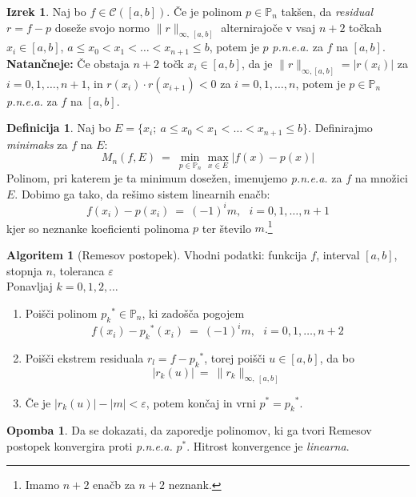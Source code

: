 \documentclass[11pt]{article}
\newcommand{\p}{\mathbb{P}}
\newcommand{\C}{\mathcal{C}}
\theoremstyle{definition}
\newtheorem{definicija}{Definicija}[section]
\theoremstyle{definition}
\newtheorem{izrek}{Izrek}
\newtheorem*{algoritem}{Algoritem}
\newtheorem*{opomba}{Opomba}
\begin{document}
\begin{izrek}

Naj bo $f \in \C([a, b])$. Če je polinom $p \in \p_n$ takšen, da \textit{residual} $r = f - p$ doseže svojo normo $\|r\|_{\infty,~[a, b]}$ alternirajoče v vsaj $n+2$ točkah $x_i \in [a, b]$, $a \leq x_0 < x_1 < \ldots < x_{n+1} \leq b$, potem je $p$ \textit{p.n.e.a.} za $f$ na $[a, b]$. \\

\textbf{Natančneje:} Če obstaja $n+2$ točk $x_i \in [a, b]$, da je $\|r\|_{\infty, [a, b]} = |r(x_i)|$ za $i = 0, 1, \ldots, n+1$, in $r(x_i) \cdot r(x_{i+1}) < 0$ za $i = 0, 1, \ldots, n$, potem je $p \in \p_n$ \textit{p.n.e.a.} za $f$ na $[a, b]$.

\end{izrek}
\vspace{0.5cm}

\begin{definicija}

Naj bo $E = \{x_i;~a \leq x_0 < x_1 < \ldots < x_{n+1} \leq b\}$. Definirajmo \textit{minimaks} za $f$ na $E$:
$$M_n(f, E) ~=~ \min_{p \in \p_n} \max_{x \in E} |f(x) - p(x)|$$
Polinom, pri katerem je ta minimum dosežen, imenujemo \textit{p.n.e.a.} za $f$ na množici $E$. Dobimo ga tako, da rešimo sistem linearnih enačb:
$$f(x_i) - p(x_i) ~=~ (-1)^i m, ~~~i = 0, 1, \ldots, n+1$$
kjer so neznanke koeficienti polinoma $p$ ter število $m$.\footnote{Imamo $n+2$ enačb za $n+2$ neznank.}

\pagebreak

\begin{algoritem}[Remesov postopek]

Vhodni podatki: funkcija $f$, interval $[a, b]$, stopnja $n$, toleranca $\varepsilon$ \\

Ponavljaj $k = 0, 1, 2, \ldots$
\begin{enumerate}
	\item Poišči polinom ${p_k}^* \in \p_n$, ki zadošča pogojem
	$$f(x_i) - {p_k}^*(x_i) ~=~ (-1)^i m, ~~~ i = 0, 1, \ldots, n+2$$
	
	\item Poišči ekstrem residuala $r_l = f - {p_k}^*$, torej poišči $u \in [a, b]$, da bo
	$$|r_k(u)| ~=~ \|r_k\|_{\infty,~[a, b]}$$
	
	\item Če je $|r_k(u)| - |m| < \varepsilon$, potem končaj in vrni $p^* = {p_k}^*$. 
\end{enumerate}
\end{algoritem}
\vspace{0.5cm}

\begin{opomba}

Da se dokazati, da zaporedje polinomov, ki ga tvori Remesov postopek konvergira proti \textit{p.n.e.a.} $p^*$. Hitrost konvergence je \textit{linearna}.

\end{opomba}
\vspace{0.5cm}

\end{definicija}
\vspace{0.5cm}
\end{document}
